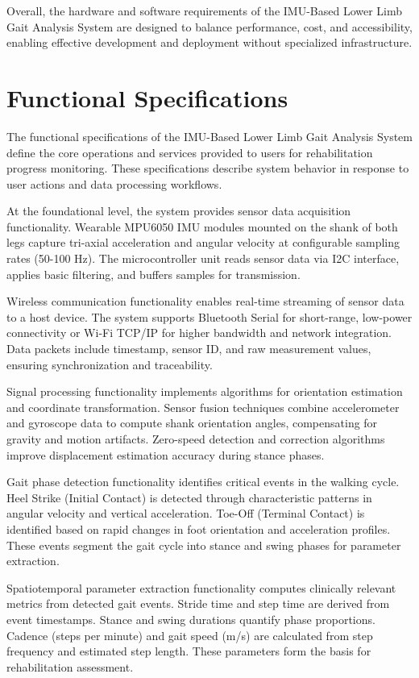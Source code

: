 \documentclass[12pt,a4paper]{report}
\begin{document}
Overall, the hardware and software requirements of the IMU-Based Lower Limb Gait Analysis System are designed to balance performance, cost, and accessibility, enabling effective development and deployment without specialized infrastructure.

\section{Functional Specifications}

The functional specifications of the IMU-Based Lower Limb Gait Analysis System define the core operations and services provided to users for rehabilitation progress monitoring. These specifications describe system behavior in response to user actions and data processing workflows.

At the foundational level, the system provides sensor data acquisition functionality. Wearable MPU6050 IMU modules mounted on the shank of both legs capture tri-axial acceleration and angular velocity at configurable sampling rates (50-100 Hz). The microcontroller unit reads sensor data via I2C interface, applies basic filtering, and buffers samples for transmission.

Wireless communication functionality enables real-time streaming of sensor data to a host device. The system supports Bluetooth Serial for short-range, low-power connectivity or Wi-Fi TCP/IP for higher bandwidth and network integration. Data packets include timestamp, sensor ID, and raw measurement values, ensuring synchronization and traceability.

Signal processing functionality implements algorithms for orientation estimation and coordinate transformation. Sensor fusion techniques combine accelerometer and gyroscope data to compute shank orientation angles, compensating for gravity and motion artifacts. Zero-speed detection and correction algorithms improve displacement estimation accuracy during stance phases.

Gait phase detection functionality identifies critical events in the walking cycle. Heel Strike (Initial Contact) is detected through characteristic patterns in angular velocity and vertical acceleration. Toe-Off (Terminal Contact) is identified based on rapid changes in foot orientation and acceleration profiles. These events segment the gait cycle into stance and swing phases for parameter extraction.

Spatiotemporal parameter extraction functionality computes clinically relevant metrics from detected gait events. Stride time and step time are derived from event timestamps. Stance and swing durations quantify phase proportions. Cadence (steps per minute) and gait speed (m/s) are calculated from step frequency and estimated step length. These parameters form the basis for rehabilitation assessment.
\end{document}
